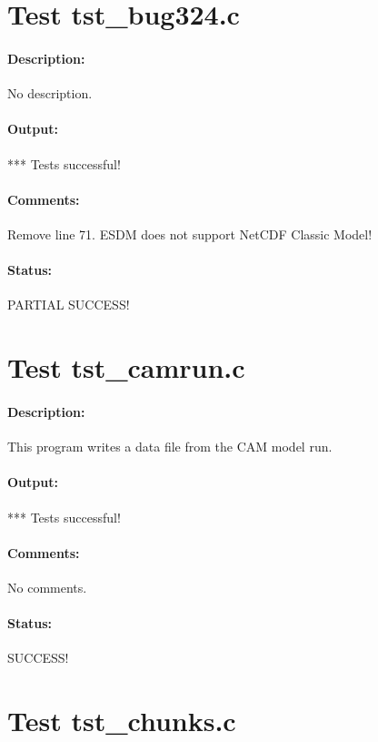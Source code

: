 \section{Test tst\_bug324.c}

\paragraph{Description:} No description.

\paragraph{Output:} *** Tests successful!

\paragraph{Comments:} Remove line 71. ESDM does not support NetCDF Classic Model!

\paragraph{Status:} PARTIAL SUCCESS!

\section{Test tst\_camrun.c}

\paragraph{Description:} This program writes a data file from the CAM model run.

\paragraph{Output:} *** Tests successful!

\paragraph{Comments:} No comments.

\paragraph{Status:} SUCCESS!

\section{Test tst\_chunks.c}

